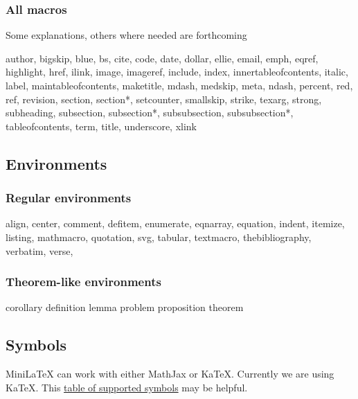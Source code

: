 \subsubsection{All macros}

Some explanations, others where needed are forthcoming

\begin{indent}
author,
bigskip,
blue,
bs,
cite,
code,
date,
dollar,
ellie,
email,
emph,
eqref,
highlight,
href,
ilink,
image,
imageref,
include,
index,
innertableofcontents,
italic,
label,
maintableofcontents,
maketitle,
mdash,
medskip,
meta,
ndash,
percent,
red,
ref,
revision,
section,
section*,
setcounter,
smallskip,
strike,
texarg,
strong,
subheading,
subsection,
subsection*,
subsubsection,
subsubsection*,
tableofcontents,
term,
title,
underscore,
xlink
\end{indent}

\subsection{Environments}

\subsubsection{Regular environments}

\begin{indent}
align,
center,
comment,
defitem,
enumerate,
eqnarray,
equation,
indent,
itemize,
listing,
mathmacro,
quotation,
svg,
tabular,
textmacro,
thebibliography,
verbatim,
verse,
\end{indent}

\subsubsection{Theorem-like environments}

\begin{indent}
corollary
definition
lemma
problem
proposition
theorem
\end{indent}



\subsection{Symbols}

MiniLaTeX can work with either MathJax or KaTeX.  Currently we are using KaTeX.  This 
\href{https://katex.org/docs/support_table.html}{table of supported symbols} may be helpful.


